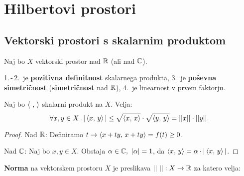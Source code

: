 \section{Hilbertovi prostori}
\subsection{Vektorski prostori s skalarnim produktom}
Naj bo \(X\) vektorski prostor nad \(\mathbb{R}\) (ali nad \(\mathbb{C}\)).

\begin{opomba}
    1.\,-\,2.\ je \textbf{pozitivna definitnost} skalarnega produkta, 3.\ je \textbf{poševna simetričnost} (\textbf{simetričnost} nad \(\mathbb{R}\)), 4.\ je linearnost v prvem faktorju.
\end{opomba}

\begin{trditev}
    Naj bo \(\left\langle \ , \,  \right\rangle\) skalarni produkt na \(X\). Velja: 
    \[\forall x,y \in X \,.\, |\left\langle x, \, y \right\rangle| \leq \sqrt{\left\langle x, \, x \right\rangle} \cdot \sqrt{\left\langle y, \, y \right\rangle} = ||x|| \cdot ||y||.\]
\end{trditev}

\begin{proof}
    Nad \(\mathbb{R}\): Definiramo \(t \to \left\langle x + ty, \, x + ty \right\rangle = f(t) \geq 0\).

    Nad \(\mathbb{C}\): Naj bo \(x, y \in X\). Obstaja \(\alpha \in \mathbb{C}, \ |\alpha| = 1\), da \(\left\langle x, \, y \right\rangle = \alpha \cdot |\left\langle x, \, y \right\rangle|\).
\end{proof}

\begin{definicija}
    \textbf{Norma} na vektorskem prostoru \(X\) je preslikava \(||\ ||: X \to \mathbb{R}\) za katero velja:
\end{definicija}

